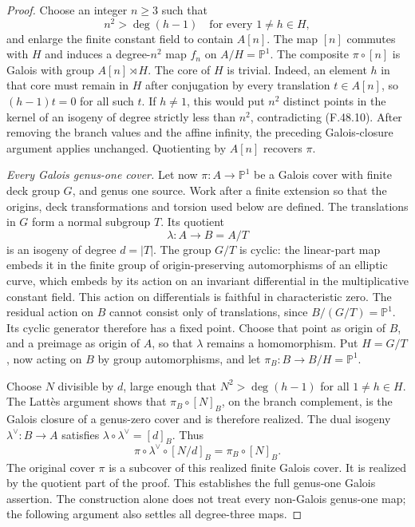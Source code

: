 \documentclass[11pt]{article}
\begin{document}
\begin{proof}
Choose an integer \(n\ge3\) such that
\[
                 n^2>\deg(h-1)
                  \quad\text{for every }1\ne h\in H,
                                                        \tag{F.48.10}
\]
and enlarge the finite constant field to contain
\(A[n]\). The map \([n]\) commutes with \(H\)
and induces a degree-\(n^2\) map \(f_n\) on
\(A/H=\mathbb P^1\). The composite
\(\pi\circ[n]\) is Galois with group
\(A[n]\rtimes H\). The core of \(H\) is trivial.
Indeed, an element \(h\) in that core must remain
in \(H\) after conjugation by every translation
\(t\in A[n]\), so \((h-1)t=0\) for all such
\(t\). If \(h\ne1\), this would put \(n^2\)
distinct points in the kernel of an isogeny of degree
strictly less than \(n^2\), contradicting (F.48.10).
After removing the branch values and the affine
infinity, the preceding Galois-closure argument applies
unchanged. Quotienting by \(A[n]\) recovers
\(\pi\).

\emph{Every Galois genus-one cover.}
Let now \(\pi:A\to\mathbb P^1\) be a Galois
cover with finite deck group \(G\), and genus one
source. Work after a finite extension so that the
origins, deck transformations and torsion used below
are defined. The translations in \(G\) form a normal
subgroup \(T\). Its quotient
\[
                  \lambda:A\longrightarrow B=A/T
\]
is an isogeny of degree \(d=|T|\). The group
\(G/T\) is cyclic: the linear-part map embeds it in
the finite group of origin-preserving automorphisms
of an elliptic curve, which embeds by its action on
an invariant differential in the multiplicative
constant field. This action on differentials is
faithful in characteristic zero. The residual action
on \(B\) cannot consist only of translations,
since \(B/(G/T)=\mathbb P^1\). Its cyclic generator
therefore has a fixed point. Choose that point as
origin of \(B\), and a preimage as origin of \(A\),
so that \(\lambda\) remains a homomorphism. Put
\(H=G/T\), now acting on \(B\) by group
automorphisms, and let
\(\pi_B:B\to B/H=\mathbb P^1\).

Choose \(N\) divisible by \(d\), large enough
that \(N^2>\deg(h-1)\) for all \(1\ne h\in H\).
The Latt\`es argument shows that
\(\pi_B\circ[N]_B\), on the branch complement,
is the Galois closure of a genus-zero cover and is
therefore realized. The dual isogeny
\(\lambda^\vee:B\to A\) satisfies
\(\lambda\circ\lambda^\vee=[d]_B\). Thus
\[
 \pi\circ\lambda^\vee\circ[N/d]_B
                       =\pi_B\circ[N]_B.
                                                        \tag{F.48.11}
\]
The original cover \(\pi\) is a subcover of this
realized finite Galois cover. It is realized by the
quotient part of the proof. This establishes the
full genus-one Galois assertion. The construction alone
does not treat every non-Galois genus-one map; the
following argument also settles all degree-three maps.


\end{proof}
\end{document}
